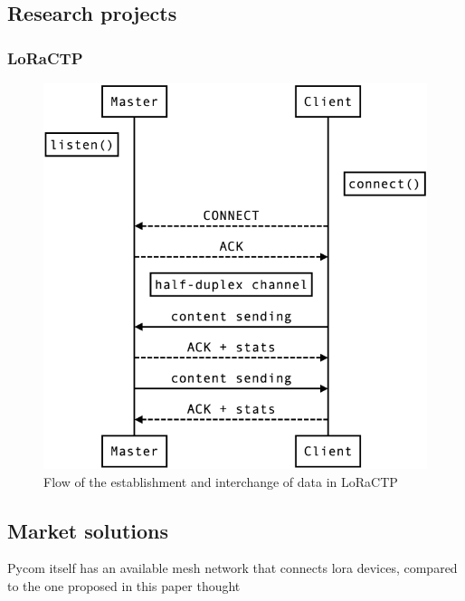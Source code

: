 			
		
		\subsection{Research projects}
		
			
			
			
			\subsubsection{LoRaCTP}
			
			
				\begin{figure}[H]
					\centering
					\includegraphics[width=.5\textwidth]{resources/img/loractp_flow}
					\caption{Flow of the establishment and interchange of data in LoRaCTP}
				\end{figure}
		
		\subsection{Market solutions}
		
		
		
			Pycom itself has an available mesh network that connects lora devices, compared to the one proposed in this paper thought
			
